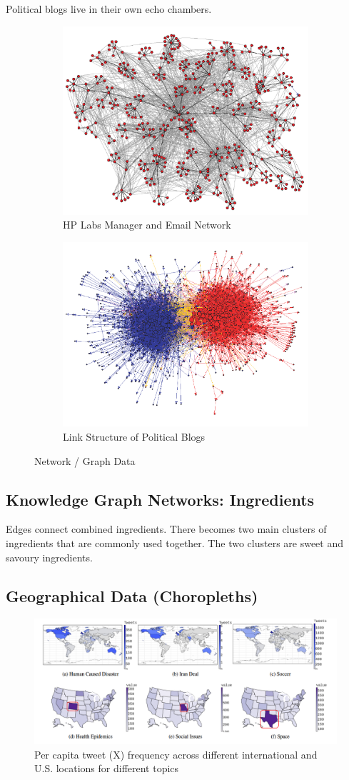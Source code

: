 \documentclass[11pt]{article}
\theoremstyle{definition}
\begin{document}
Political blogs live in their own echo chambers.
\begin{figure}
  \centering
  \begin{subfigure}{.5\textwidth}
    \centering
    \includegraphics[width=.4\linewidth]{9.png}
    \caption{HP Labs Manager and Email Network}
    \label{fig:sub3}
  \end{subfigure}
  \begin{subfigure}{.5\textwidth}
    \centering
    \includegraphics[width=.4\linewidth]{10.png}
    \caption{Link Structure of Political Blogs}
    \label{fig:sub4}
  \end{subfigure}
  \caption{Network / Graph Data}
  \label{fig:2}
\end{figure}
\FloatBarrier
\subsection{Knowledge Graph Networks: Ingredients}
  Edges connect combined ingredients. 
  There becomes two main clusters of ingredients that are commonly used together.
  The two clusters are sweet and savoury ingredients.
\subsection{Geographical Data (Choropleths)}
\begin{figure}[h]
  \centering
  \includegraphics[width=\textwidth]{11.png}
  \caption{Per capita tweet (X) frequency across different international and U.S. locations for different topics}
  \label{fig:3}
\end{figure}
\end{document}
